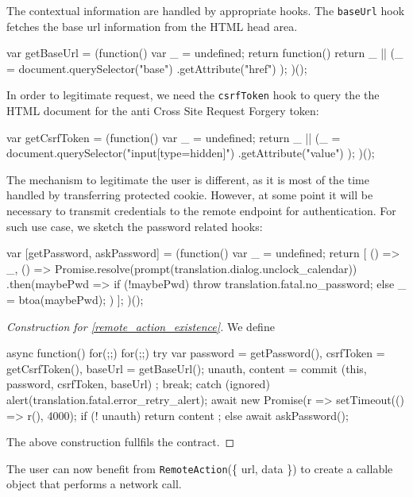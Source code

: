 \documentclass[12pt,a4paper]{article}
\newcommand{\word}[1]{\texttt{#1}}
\begin{document}
The contextual information are handled by appropriate hooks.
The \word{baseUrl} hook fetches the base url information from the
HTML head area.

\begin{code}
var getBaseUrl = (function() {
  var _ = undefined;
  return function() {
    return _ || (_ =
      document.querySelector("base")
              .getAttribute("href")
    );
  }
})();
\end{code}

In order to legitimate request, we need the \word{csrfToken} hook
to query the the HTML document
for the anti Cross Site Request Forgery token:

\begin{code}
var getCsrfToken = (function() {
  var _ = undefined;
  return _ || (_ = document.querySelector("input[type=hidden]")
                   .getAttribute("value")
              );
})();
\end{code}

The mechanism to legitimate the user is different, as it is most of
the time handled by transferring protected cookie. However, at some point
it will be necessary to transmit credentials to the remote endpoint for
authentication. For such use case, we sketch the password related hooks:

\begin{code}
var [getPassword, askPassword] = (function() {
  var _ = undefined;
  return [
    () => _,
    () => Promise.resolve(prompt(translation.dialog.unclock_calendar))
          .then(maybePwd => {
            if (!maybePwd) throw translation.fatal.no_password;
            else _ = btoa(maybePwd);
          })
  ];
})();
\end{code}

\begin{proof}[Construction for \ref{remote_action_existence}]
We define
\begin{code}
async function() { for(;;) {
  for(;;) { try {
    var            password = getPassword(),
                  csrfToken = getCsrfToken(),
                    baseUrl = getBaseUrl();
        { unauth, content } = commit (this, password, csrfToken, baseUrl)
    ; break;
  } catch (ignored) {
    alert(translation.fatal.error_retry_alert);
    await new Promise(r => setTimeout(() => r(), 4000);
  } }
  if (! unauth) return { content }; else await askPassword();
} }
\end{code}
The above construction fullfils the contract.
\end{proof}
The user can now benefit from \word{RemoteAction}(\{ url, data \})
to create a callable object that performs a network call.
\end{document}
